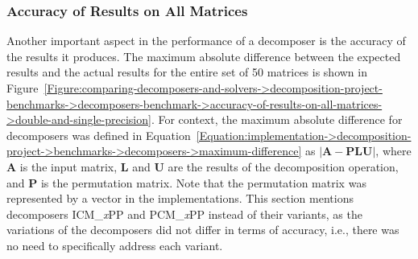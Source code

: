 \subsubsection{Accuracy of Results on All Matrices}\label{Subsection:comparing-decomposers-and-solvers->decomposition-project-benchmarks->decomposers-benchmark->accuracy-of-results-on-all-matrices}
Another important aspect in the performance of a decomposer is the accuracy of the results it produces.
The maximum absolute difference between the expected results and the actual results for the entire set of 50 matrices is shown in Figure~\ref{Figure:comparing-decomposers-and-solvers->decomposition-project-benchmarks->decomposers-benchmark->accuracy-of-results-on-all-matrices->double-and-single-precision}.
For context, the maximum absolute difference for decomposers was defined in Equation~\ref{Equation:implementation->decomposition-project->benchmarks->decomposers->maximum-difference} as $\left| \mathbf{A} - \mathbf{PLU} \right|$, where $\mathbf{A}$ is the input matrix, $\mathbf{L}$ and $\mathbf{U}$ are the results of the decomposition operation, and $\mathbf{P}$ is the permutation matrix.
Note that the permutation matrix was represented by a vector in the implementations.
This section mentions decomposers ICM\_\textit{x}PP and PCM\_\textit{x}PP instead of their variants, as the variations of the decomposers did not differ in terms of accuracy, i.e., there was no need to specifically address each variant.

